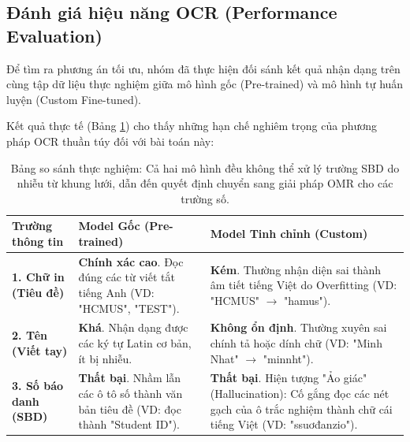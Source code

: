 \documentclass[6pt, a4paper]{report}
\begin{document}
	\subsection{Đánh giá hiệu năng OCR (Performance Evaluation)}
	Để tìm ra phương án tối ưu, nhóm đã thực hiện đối sánh kết quả nhận dạng trên cùng tập dữ liệu thực nghiệm giữa mô hình gốc (Pre-trained) và mô hình tự huấn luyện (Custom Fine-tuned).
	
	Kết quả thực tế (Bảng \ref{tab:ocr_compare}) cho thấy những hạn chế nghiêm trọng của phương pháp OCR thuần túy đối với bài toán này:
	
	\begin{table}[H]
		\centering
		\begin{tabular}{|l|p{5cm}|p{5cm}|}
			\hline
			\textbf{Trường thông tin} & \textbf{Model Gốc (Pre-trained)} & \textbf{Model Tinh chỉnh (Custom)} \\ \hline
			
			\textbf{1. Chữ in (Tiêu đề)} & \textbf{Chính xác cao}. \newline Đọc đúng các từ viết tắt tiếng Anh (VD: "HCMUS", "TEST"). & \textbf{Kém}. \newline Thường nhận diện sai thành âm tiết tiếng Việt do Overfitting (VD: "HCMUS" $\rightarrow$ "hamus"). \\ \hline
			
			\textbf{2. Tên (Viết tay)} & \textbf{Khá}. \newline Nhận dạng được các ký tự Latin cơ bản, ít bị nhiễu. & \textbf{Không ổn định}. \newline Thường xuyên sai chính tả hoặc dính chữ (VD: "Minh Nhat" $\rightarrow$ "minnht"). \\ \hline
			
			\textbf{3. Số báo danh (SBD)} & \textbf{Thất bại}. \newline Nhầm lẫn các ô tô số thành văn bản tiêu đề (VD: đọc thành "Student ID"). & \textbf{Thất bại}. \newline Hiện tượng "Ảo giác" (Hallucination): Cố gắng đọc các nét gạch của ô trắc nghiệm thành chữ cái tiếng Việt (VD: "ssuơđanzio"). \\ \hline
		\end{tabular}
		\caption{Bảng so sánh thực nghiệm: Cả hai mô hình đều không thể xử lý trường SBD do nhiễu từ khung lưới, dẫn đến quyết định chuyển sang giải pháp OMR cho các trường số.}
		\label{tab:ocr_compare}
	\end{table}
	
\end{document}
